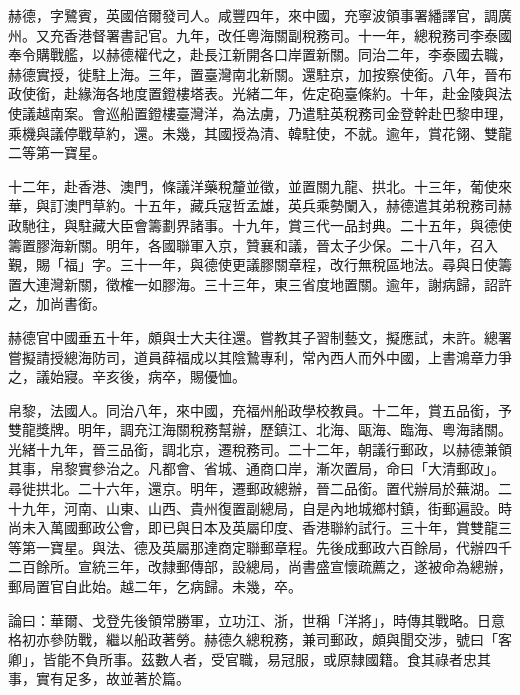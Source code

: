 \begin{pinyinscope}
赫德，字鷺賓，英國倍爾發司人。咸豐四年，來中國，充寧波領事署繙譯官，調廣州。又充香港督署書記官。九年，改任粵海關副稅務司。十一年，總稅務司李泰國奉令購戰艦，以赫德權代之，赴長江新開各口岸置新關。同治二年，李泰國去職，赫德實授，徙駐上海。三年，置臺灣南北新關。還駐京，加按察使銜。八年，晉布政使銜，赴緣海各地度置鐙樓塔表。光緒二年，佐定砲臺條約。十年，赴金陵與法使議越南案。會巡船置鐙樓臺灣洋，為法虜，乃遣駐英稅務司金登幹赴巴黎申理，乘機與議停戰草約，還。未幾，其國授為清、韓駐使，不就。逾年，賞花翎、雙龍二等第一寶星。

十二年，赴香港、澳門，條議洋藥稅釐並徵，並置關九龍、拱北。十三年，葡使來華，與訂澳門草約。十五年，藏兵寇哲孟雄，英兵乘勢闌入，赫德遣其弟稅務司赫政馳往，與駐藏大臣會籌劃界諸事。十九年，賞三代一品封典。二十五年，與德使籌置膠海新關。明年，各國聯軍入京，贊襄和議，晉太子少保。二十八年，召入覲，賜「福」字。三十一年，與德使更議膠關章程，改行無稅區地法。尋與日使籌置大連灣新關，徵榷一如膠海。三十三年，東三省度地置關。逾年，謝病歸，詔許之，加尚書銜。

赫德官中國垂五十年，頗與士大夫往還。嘗教其子習制藝文，擬應試，未許。總署嘗擬請授總海防司，道員薛福成以其陰鷙專利，常內西人而外中國，上書鴻章力爭之，議始寢。辛亥後，病卒，賜優恤。

帛黎，法國人。同治八年，來中國，充福州船政學校教員。十二年，賞五品銜，予雙龍獎牌。明年，調充江海關稅務幫辦，歷鎮江、北海、甌海、臨海、粵海諸關。光緒十九年，晉三品銜，調北京，遷稅務司。二十二年，朝議行郵政，以赫德兼領其事，帛黎實參治之。凡都會、省城、通商口岸，漸次置局，命曰「大清郵政」。尋徙拱北。二十六年，還京。明年，遷郵政總辦，晉二品銜。置代辦局於蕪湖。二十九年，河南、山東、山西、貴州復置副總局，自是內地城鄉村鎮，街郵遍設。時尚未入萬國郵政公會，即已與日本及英屬印度、香港聯約試行。三十年，賞雙龍三等第一寶星。與法、德及英屬那達商定聯郵章程。先後成郵政六百餘局，代辦四千二百餘所。宣統三年，改隸郵傳部，設總局，尚書盛宣懷疏薦之，遂被命為總辦，郵局置官自此始。越二年，乞病歸。未幾，卒。

論曰：華爾、戈登先後領常勝軍，立功江、浙，世稱「洋將」，時傳其戰略。日意格初亦參防戰，繼以船政著勞。赫德久總稅務，兼司郵政，頗與聞交涉，號曰「客卿」，皆能不負所事。茲數人者，受官職，易冠服，或原隸國籍。食其祿者忠其事，實有足多，故並著於篇。


\end{pinyinscope}